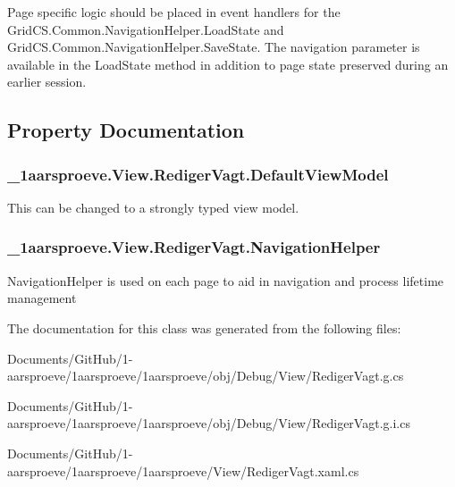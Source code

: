 Page specific logic should be placed in event handlers for the Grid\+C\+S.\+Common.\+Navigation\+Helper.\+Load\+State and Grid\+C\+S.\+Common.\+Navigation\+Helper.\+Save\+State. The navigation parameter is available in the Load\+State method in addition to page state preserved during an earlier session. 

\subsection{Property Documentation}
\hypertarget{class__1aarsproeve_1_1_view_1_1_rediger_vagt_af2df54817af67729bd484de917de7bb2}{}
\subsubsection[{Default\+View\+Model}]{ \+\_\+1aarsproeve.\+View.\+Rediger\+Vagt.\+Default\+View\+Model\hspace{0.3cm}{\ttfamily [get]}}\label{class__1aarsproeve_1_1_view_1_1_rediger_vagt_af2df54817af67729bd484de917de7bb2}


This can be changed to a strongly typed view model. 

\hypertarget{class__1aarsproeve_1_1_view_1_1_rediger_vagt_a205f8abe3b935baab61ee977737d2e03}{}
\subsubsection[{Navigation\+Helper}]{ \+\_\+1aarsproeve.\+View.\+Rediger\+Vagt.\+Navigation\+Helper\hspace{0.3cm}{\ttfamily [get]}}\label{class__1aarsproeve_1_1_view_1_1_rediger_vagt_a205f8abe3b935baab61ee977737d2e03}


Navigation\+Helper is used on each page to aid in navigation and process lifetime management 



The documentation for this class was generated from the following files\+:\begin{DoxyCompactItemize}
\item 
Documents/\+Git\+Hub/1-\/aarsproeve/1aarsproeve/1aarsproeve/obj/\+Debug/\+View/Rediger\+Vagt.\+g.\+cs\item 
Documents/\+Git\+Hub/1-\/aarsproeve/1aarsproeve/1aarsproeve/obj/\+Debug/\+View/Rediger\+Vagt.\+g.\+i.\+cs\item 
Documents/\+Git\+Hub/1-\/aarsproeve/1aarsproeve/1aarsproeve/\+View/Rediger\+Vagt.\+xaml.\+cs\end{DoxyCompactItemize}

